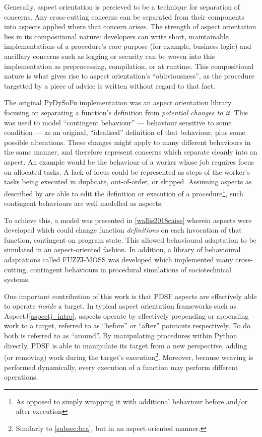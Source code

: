 Generally, aspect orientation is percieved to be a technique for separation of
concerns. Any cross-cutting concerns can be separated from their components into
aspects applied where that concern arises. The strength of aspect orientation
lies in its compositional nature: developers can write short, maintainable
implementations of a procedure's core purpose (for example, business logic) and
ancillary concerns such as logging or security can be woven into this
implementation as preprocessing, compilation, or at runtime. This compositional
nature is what gives rise to aspect orientation's ``obliviousness'', as the
procedure targetted by a piece of advice is written without regard to that fact.

The original PyDySoFu implementation was an aspect orientation library focusing
on separating a function's definition from \emph{potential changes to it}. This
was used to model ``contingent behaviour'' --- behaviour sensitive to some
condition --- as an original, ``idealised'' definition of that behaviour, plus
some possible alterations. These changes might apply to many different
behaviours in the same manner, and therefore represent concerns which separate
cleanly into an aspect. An example would be the behaviour of a worker whose job
requires focus on allocated tasks. A lack of focus could be represented as steps
of the worker's tasks being executed in duplicate, out-of-order, or skipped.
Assuming aspects as described by \citeauthor{kiczales1997aspect} are able to
edit the definition or execution of a procedure\footnote{As opposed to simply
wrapping it with additional behaviour before and/or after execution}, such
contingent behaviours are well modelled as aspects.

To achieve this, a model was presented in \cref{wallis2018caise} wherein aspects
were developed which could change function \emph{definitions} on each invocation
of that function, contingent on program state. This allowed behavioural
adaptation to be simulated in an aspect-oriented fashion. In addition, a library
of behavioural adaptations called FUZZI-MOSS was developed
which implemented many cross-cutting, contingent behaviours in procedural
simulations of sociotechnical systems.

One important contribution of this work is that PDSF aspects are effectively
able to operate \emph{inside} a target. In typical aspect orientation frameworks
such as AspectJ\cref{aspectj_intro}, aspects operate by effectively prepending
or appending work to a target, referred to as ``before'' or ``after'' pointcuts
respectively. To do both is referred to as ``around''. By manipulating
procedures within Python directly, PDSF is able to manipulate its target from a
new perspective, adding (or removing) work during the target's
execution\footnote{Similarly to \cref{subsec:bca}, but in an aspect oriented
manner.}. Moreover, because weaving is performed dynamically, every execution of
a function may perform different operations.

